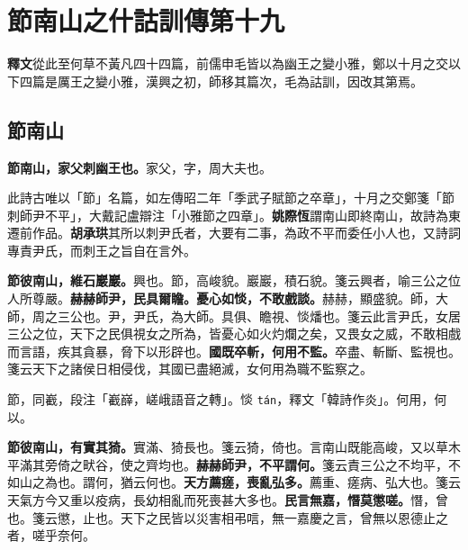 \chapter{節南山之什詁訓傳第十九}

\begin{quoting}\textbf{釋文}從此至何草不黃凡四十四篇，前儒申毛皆以為幽王之變小雅，鄭以十月之交以下四篇是厲王之變小雅，漢興之初，師移其篇次，毛為詁訓，因改其第焉。\end{quoting}

\section{節南山}


\textbf{節南山，家父刺幽王也。}{\footnotesize 家父，字，周大夫也。}

\begin{quoting}此詩古唯以「節」名篇，如左傳昭二年「季武子賦節之卒章」，十月之交鄭箋「節刺師尹不平」，大戴記盧辯注「小雅節之四章」。\textbf{姚際恆}謂南山即終南山，故詩為東遷前作品。\textbf{胡承珙}其所以刺尹氏者，大要有二事，為政不平而委任小人也，又詩詞專責尹氏，而刺王之旨自在言外。\end{quoting}

\textbf{節彼南山，維石巖巖。}{\footnotesize 興也。節，高峻貌。巖巖，積石貌。箋云興者，喻三公之位人所尊嚴。}\textbf{赫赫師尹，民具爾瞻。憂心如惔，不敢戲談。}{\footnotesize 赫赫，顯盛貌。師，大師，周之三公也。尹，尹氏，為大師。具俱、瞻視、惔燔也。箋云此言尹氏，女居三公之位，天下之民俱視女之所為，皆憂心如火灼爛之矣，又畏女之威，不敢相戲而言語，疾其貪暴，脅下以形辟也。}\textbf{國既卒斬，何用不監。}{\footnotesize 卒盡、斬斷、監視也。箋云天下之諸侯日相侵伐，其國已盡絕滅，女何用為職不監察之。}

\begin{quoting}節，同嶻，段注「嶻嶭，嵯峨語音之轉」。惔 \texttt{tán}，釋文「韓詩作炎」。何用，何以。\end{quoting}

\textbf{節彼南山，有實其猗。}{\footnotesize 實滿、猗長也。箋云猗，倚也。言南山既能高峻，又以草木平滿其旁倚之畎谷，使之齊均也。}\textbf{赫赫師尹，不平謂何。}{\footnotesize 箋云責三公之不均平，不如山之為也。謂何，猶云何也。}\textbf{天方薦瘥，喪亂弘多。}{\footnotesize 薦重、瘥病、弘大也。箋云天氣方今又重以疫病，長幼相亂而死喪甚大多也。}\textbf{民言無嘉，憯莫懲嗟。}{\footnotesize 憯，曾也。箋云懲，止也。天下之民皆以災害相弔唁，無一嘉慶之言，曾無以恩德止之者，嗟乎奈何。}

